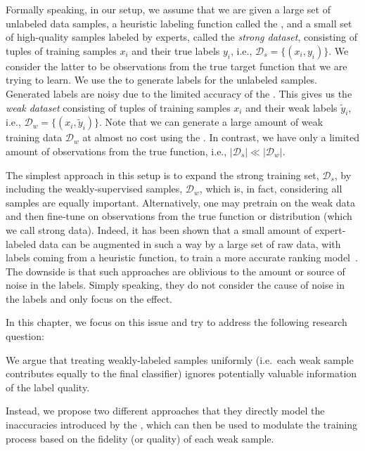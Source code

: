 Formally speaking, in our setup, we assume that we are given a large set of unlabeled data samples, a heuristic labeling function called the \emph{\wa}, and a small set of high-quality samples labeled by experts, called the \emph{strong dataset}, consisting of tuples of training samples $x_i$ and their true labels $y_i$, i.e., $\mathcal{D}_s=\{(x_i,y_i)\}$. We consider the latter to be observations from the true target function that we are trying to learn. 
We use the \wa to generate labels for the unlabeled samples. Generated labels are noisy due to the limited accuracy of the \wa. This gives us the \emph{weak dataset} consisting of tuples of training samples $x_i$ and their weak labels $\tilde{y}_i$, i.e., $\mathcal{D}_w=\{(x_i, \tilde{y}_i)\}$.  Note that we can generate a large amount of weak training data $\mathcal{D}_w$ at almost no cost using the \wa. In contrast, we have only a limited amount of observations from the true function, i.e., $|\mathcal{D}_s| \ll |\mathcal{D}_w|$. 

The simplest approach in this setup is to expand the strong training set, $\mathcal{D}_s$, by including the weakly-supervised samples, $\mathcal{D}_w$, which is, in fact, considering all samples are equally important. Alternatively, one may pretrain on the weak data and then fine-tune on observations from the true function or distribution (which we call strong data). Indeed, it has been shown that a small amount of expert-labeled data can be augmented in such a way by a large set of raw data, with labels coming from a heuristic function, to train a more accurate ranking model~\citep{Dehghani:2017:SIGIR, Severyn:2015:SIGIR}.
The downside is that such approaches are oblivious to the amount or source of noise in the labels. Simply speaking, they do not consider the cause of noise in the labels and only focus on the effect. 

In this chapter, we focus on this issue and try to address the following research question:

We argue that treating weakly-labeled samples uniformly (i.e.\ each weak sample contributes equally to the final classifier) ignores potentially valuable information of the label quality. 

Instead, we propose two different approaches that they directly model the inaccuracies introduced by the \wa, which can then be used to modulate the training process based on the fidelity (or quality) of each weak sample. 


